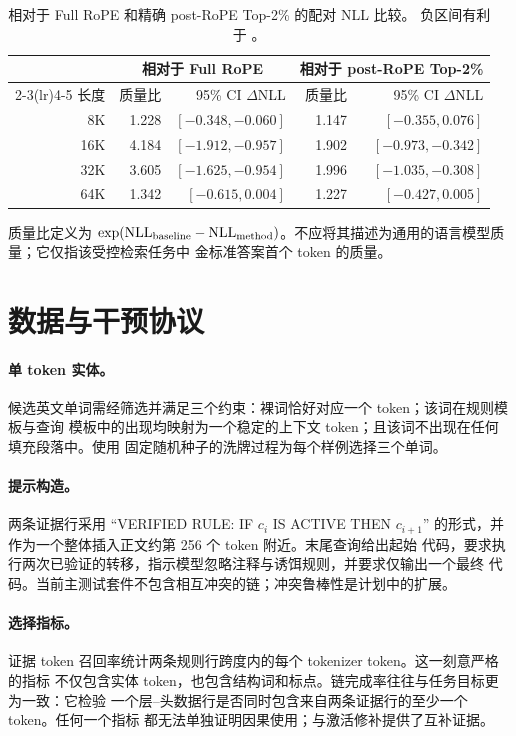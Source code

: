 \begin{table}[h]
  \caption{\methodpost 相对于 Full RoPE 和精确 post-RoPE Top-2\% 的配对 NLL 比较。
  负区间有利于 \methodpost。}
  \centering
  \small
  \begin{tabular}{r rr rr}
    \toprule
    & \multicolumn{2}{c}{相对于 Full RoPE}
    & \multicolumn{2}{c}{相对于 post-RoPE Top-2\%}\\
    \cmidrule(lr){2-3}\cmidrule(lr){4-5}
    长度 & 质量比 & 95\% CI $\Delta$NLL
           & 质量比 & 95\% CI $\Delta$NLL\\
    \midrule
    8K  & 1.228 & $[-0.348,-0.060]$ & 1.147 & $[-0.355,0.076]$\\
    16K & 4.184 & $[-1.912,-0.957]$ & 1.902 & $[-0.973,-0.342]$\\
    32K & 3.605 & $[-1.625,-0.954]$ & 1.996 & $[-1.035,-0.308]$\\
    64K & 1.342 & $[-0.615,0.004]$  & 1.227 & $[-0.427,0.005]$\\
    \bottomrule
  \end{tabular}
\end{table}

质量比定义为 $\exp(\mathrm{NLL}_{\rm baseline}-
\mathrm{NLL}_{\rm method})$。不应将其描述为通用的语言模型质量；它仅指该受控检索任务中
金标准答案首个 token 的质量。

\section{数据与干预协议}
\label{app:protocol}

\paragraph{单 token 实体。}
候选英文单词需经筛选并满足三个约束：裸词恰好对应一个 token；该词在规则模板与查询
模板中的出现均映射为一个稳定的上下文 token；且该词不出现在任何填充段落中。使用
固定随机种子的洗牌过程为每个样例选择三个单词。

\paragraph{提示构造。}
两条证据行采用 ``VERIFIED RULE: IF $c_i$ IS ACTIVE THEN
$c_{i+1}$'' 的形式，并作为一个整体插入正文约第 256 个 token 附近。末尾查询给出起始
代码，要求执行两次已验证的转移，指示模型忽略注释与诱饵规则，并要求仅输出一个最终
代码。当前主测试套件不包含相互冲突的链；冲突鲁棒性是计划中的扩展。

\paragraph{选择指标。}
证据 token 召回率统计两条规则行跨度内的每个 tokenizer token。这一刻意严格的指标
不仅包含实体 token，也包含结构词和标点。链完成率往往与任务目标更为一致：它检验
一个层--头数据行是否同时包含来自两条证据行的至少一个 token。任何一个指标
都无法单独证明因果使用；\GoldPPL 与激活修补提供了互补证据。

